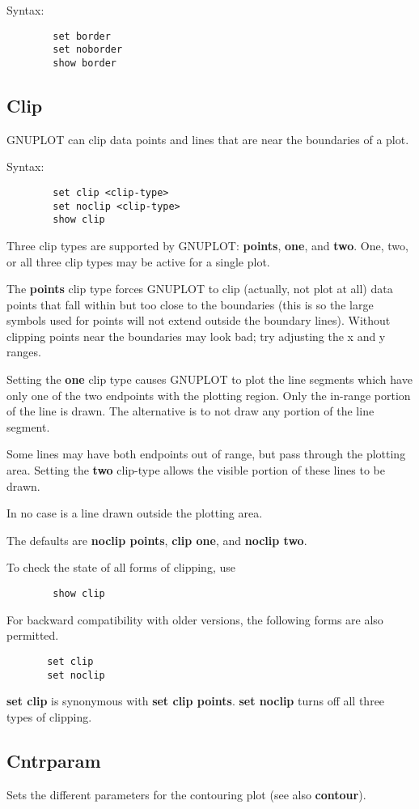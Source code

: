 Syntax:
\begin{verbatim}
        set border
        set noborder
        show border
\end{verbatim}
\subsection{Clip}
GNUPLOT can clip data points and lines that are near the boundaries
of a plot. 

Syntax:
\begin{verbatim}
        set clip <clip-type>
        set noclip <clip-type>
        show clip
\end{verbatim}

Three clip types are supported by GNUPLOT: {\bf points}, {\bf one}, and {\bf two}.
One, two, or all three clip types may be active for a single plot.

The {\bf points} clip type forces GNUPLOT to clip (actually, not plot at
all) data points that fall within but too close to the boundaries
(this is so the large symbols used for points will not extend outside
the boundary lines). Without clipping points near the boundaries may
look bad; try adjusting the x and y ranges.

Setting the {\bf one} clip type causes GNUPLOT to plot the line segments
which have only one of the two endpoints with the plotting region.
Only the in-range portion of the line is drawn.  The alternative is to
not draw any portion of the line segment.

Some lines may have both endpoints out of range, but pass through the
plotting area. Setting the {\bf two} clip-type allows the visible portion
of these lines to be drawn.

In no case is a line drawn outside the plotting area.

The defaults are {\bf noclip points}, {\bf clip one}, and {\bf noclip two}.

To check the state of all forms of clipping, use
\begin{verbatim}
        show clip
\end{verbatim}

For backward compatibility with older versions, the following forms
are also permitted.
\begin{verbatim}
       set clip
       set noclip
\end{verbatim}
{\bf set clip} is synonymous with {\bf set clip points}. {\bf set noclip} turns
off all three types of clipping.
\subsection{Cntrparam}
Sets the different parameters for the contouring plot (see also {\bf contour}).

